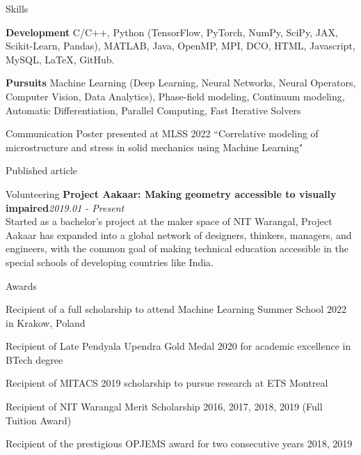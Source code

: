 \documentclass{resume}
\begin{document}
\begin{rSection}{Skills}
  \item \textbf{Development} \textemdash  C/C++, Python (TensorFlow, PyTorch, NumPy, SciPy, JAX, Scikit-Learn, Pandas), MATLAB, Java, OpenMP, MPI, DCO,  HTML, Javascript, MySQL, {\LaTeX}, GitHub.
  \item \textbf{Pursuits} \textemdash Machine Learning (Deep Learning, Neural Networks, Neural Operators, Computer Vision, Data Analytics), Phase-field modeling, Continuum modeling, Automatic Differentiation, Parallel Computing, Fast Iterative Solvers
\end{rSection}

\begin{rSection}{Communication}
Poster presented at MLSS 2022 \textemdash``Correlative modeling of microstructure and stress in solid mechanics using Machine Learning"

Published article \textemdash{}

\end{rSection}


\begin{rSection}{Volunteering}
{\bf Project Aakaar: Making geometry accessible to visually impaired}\hfill {\em 2019.01 - Present}\\
Started as a bachelor's project at the maker space of NIT Warangal, Project Aakaar has expanded into a global network of designers, thinkers, managers, and engineers, with the common goal of making technical education accessible in the special schools of developing countries like India.
\end{rSection}

\begin{rSection}{Awards} \itemsep -3pt
\item Recipient of a full scholarship to attend Machine Learning Summer School 2022 in Krakow, Poland
\item Recipient of Late Pendyala Upendra Gold Medal 2020 for academic excellence in BTech degree
\item Recipient of MITACS 2019 scholarship to pursue research at ETS Montreal \hfill 
\item Recipient of NIT Warangal Merit Scholarship 2016, 2017, 2018, 2019 (Full Tuition Award)
\item Recipient of the prestigious OPJEMS award for two consecutive years 2018, 2019 \hfill 


\end{rSection}
\end{document}
